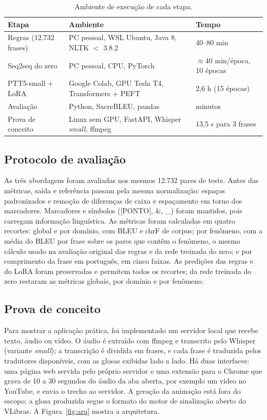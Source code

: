 \documentclass[12pt]{article}
\newcommand{\gl}[1]{\textsf{\small #1}}
\begin{document}
\begin{table}[!htbp]\centering\footnotesize
\caption{Ambiente de execução de cada etapa.}\label{tab:amb}
\begin{tabularx}{\textwidth}{@{}lXl@{}}\toprule
Etapa & Ambiente & Tempo\\\midrule
Regras (12.732 frases) & PC pessoal, WSL Ubuntu, Java 8, NLTK $<$ 3.8.2 & 40--80 min\\
Seq2seq do zero & PC pessoal, CPU, PyTorch & $\approx$40 min/época, 10 épocas\\
PTT5-small + LoRA & Google Colab, GPU Tesla T4, Transformers + PEFT & 2,6 h (15 épocas)\\
Avaliação & Python, SacreBLEU, pandas & minutos\\
Prova de conceito & Linux sem GPU, FastAPI, Whisper \emph{small}, ffmpeg & 13,5 s para 3 frases\\\bottomrule
\end{tabularx}
\end{table}

\subsection{Protocolo de avaliação}

As três abordagens foram avaliadas nos mesmos 12.732 pares de teste. Antes das métricas, saída e referência passam pela mesma normalização: espaços padronizados e remoção de diferenças de caixa e espaçamento em torno dos marcadores. Marcadores e símbolos (\gl{[PONTO]}, \gl{\&}, \gl{\_}) foram mantidos, pois carregam informação linguística. As métricas foram calculadas em quatro recortes: global e por domínio, com BLEU e chrF de corpus; por fenômeno, com a média do BLEU por frase sobre os pares que contêm o fenômeno, o mesmo cálculo usado na avaliação original das regras e da rede treinada do zero; e por comprimento da frase em português, em cinco faixas. As predições das regras e do LoRA foram preservadas e permitem todos os recortes; da rede treinada do zero restaram as métricas globais, por domínio e por fenômeno.

\subsection{Prova de conceito}

Para mostrar a aplicação prática, foi implementado um servidor local que recebe texto, áudio ou vídeo. O áudio é extraído com ffmpeg e transcrito pelo Whisper \cite{whisper} (variante \emph{small}); a transcrição é dividida em frases, e cada frase é traduzida pelos tradutores disponíveis, com as glosas exibidas lado a lado. Há duas interfaces: uma página web servida pelo próprio servidor e uma extensão para o Chrome que grava de 10 a 30 segundos do áudio da aba aberta, por exemplo um vídeo no YouTube, e envia o trecho ao servidor. A geração da animação está fora do escopo; a glosa produzida segue o formato do motor de sinalização aberto do VLibras. A Figura~\ref{fig:arq} mostra a arquitetura.
\end{document}
